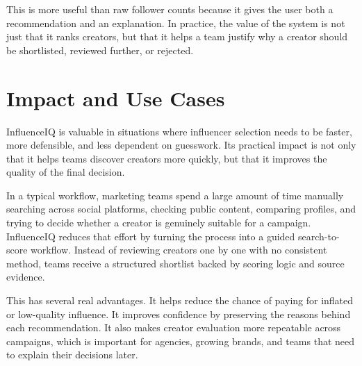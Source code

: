 \documentclass[11pt,a4paper]{article}
\begin{document}
\begin{figure}[htbp]
\centering
{}
\end{figure}

This is more useful than raw follower counts because it gives the user both a recommendation and an explanation. In practice, the value of the system is not just that it ranks creators, but that it helps a team justify why a creator should be shortlisted, reviewed further, or rejected.

\section{Impact and Use Cases}

InfluenceIQ is valuable in situations where influencer selection needs to be faster, more defensible, and less dependent on guesswork. Its practical impact is not only that it helps teams discover creators more quickly, but that it improves the quality of the final decision.

In a typical workflow, marketing teams spend a large amount of time manually searching across social platforms, checking public content, comparing profiles, and trying to decide whether a creator is genuinely suitable for a campaign. InfluenceIQ reduces that effort by turning the process into a guided search-to-score workflow. Instead of reviewing creators one by one with no consistent method, teams receive a structured shortlist backed by scoring logic and source evidence.

This has several real advantages. It helps reduce the chance of paying for inflated or low-quality influence. It improves confidence by preserving the reasons behind each recommendation. It also makes creator evaluation more repeatable across campaigns, which is important for agencies, growing brands, and teams that need to explain their decisions later.
\end{document}
